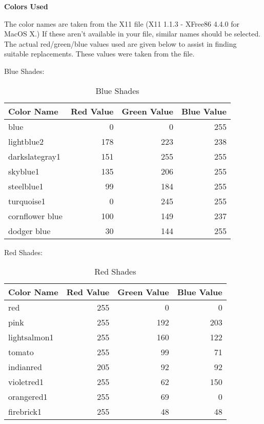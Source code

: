 {\bf Colors Used}

The color names are taken from the X11  file (X11 1.1.3 -
XFree86 4.4.0 for MacOS X.)  If these aren't available in your 
file, similar names should be selected.  The actual red/green/blue values used
are given below to assist in finding suitable replacements.  These values were
taken from the  file.

Blue Shades:

\begin{table}[ht]
\begin{center}
\begin{tabular}{|l|r|r|r|}
\hline
{\bf Color Name} & {\bf Red Value} & {\bf Green Value} & {\bf Blue Value} \\
\hline
blue            &   0 &   0 & 255 \\
lightblue2      & 178 & 223 & 238 \\
darkslategray1  & 151 & 255 & 255 \\
skyblue1        & 135 & 206 & 255 \\
steelblue1      &  99 & 184 & 255 \\
turquoise1      &   0 & 245 & 255 \\
cornflower blue & 100 & 149 & 237 \\
dodger blue     &  30 & 144 & 255 \\
\hline
\end{tabular}
\end{center}
\caption{Blue Shades}
\end{table}

\eject

Red Shades:

\begin{table}[ht]
\begin{center}
\begin{tabular}{|l|r|r|r|}
\hline
{\bf Color Name} & {\bf Red Value} & {\bf Green Value} & {\bf Blue Value} \\
\hline
red          &    255 &   0 &   0 \\
pink         &    255 & 192 & 203 \\
lightsalmon1 &    255 & 160 & 122 \\
tomato       &    255 &  99 &  71 \\
indianred    &    205 &  92 &  92 \\
violetred1   &    255 &  62 & 150 \\
orangered1   &    255 &  69 &   0 \\
firebrick1   &    255 &  48 &  48 \\
\hline
\end{tabular}
\end{center}
\caption{Red Shades}
\end{table}

